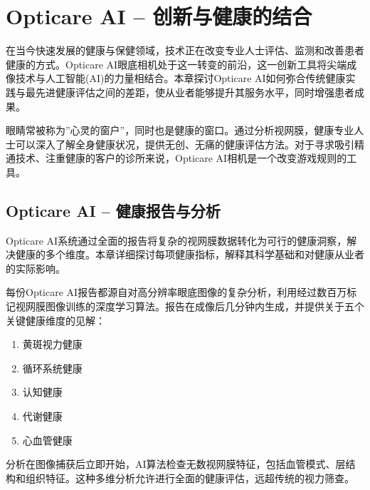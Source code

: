 \documentclass[
  Letterpaper,
]{scrbook}
\providecommand{\tightlist}{%
  \setlength{\itemsep}{0pt}\setlength{\parskip}{0pt}}\usepackage{longtable,booktabs,array}
\begin{document}

\chapter{Opticare AI --
创新与健康的结合}\label{opticare-ai-ux521bux65b0ux4e0eux5065ux5eb7ux7684ux7ed3ux5408}

在当今快速发展的健康与保健领域，技术正在改变专业人士评估、监测和改善患者健康的方式。Opticare
AI眼底相机处于这一转变的前沿，这一创新工具将尖端成像技术与人工智能(AI)的力量相结合。本章探讨Opticare
AI如何弥合传统健康实践与最先进健康评估之间的差距，使从业者能够提升其服务水平，同时增强患者成果。

眼睛常被称为''心灵的窗户''，同时也是健康的窗口。通过分析视网膜，健康专业人士可以深入了解全身健康状况，提供无创、无痛的健康评估方法。对于寻求吸引精通技术、注重健康的客户的诊所来说，Opticare
AI相机是一个改变游戏规则的工具。

\section{Opticare AI --
健康报告与分析}\label{opticare-ai-ux5065ux5eb7ux62a5ux544aux4e0eux5206ux6790}

Opticare
AI系统通过全面的报告将复杂的视网膜数据转化为可行的健康洞察，解决健康的多个维度。本章详细探讨每项健康指标，解释其科学基础和对健康从业者的实际影响。

每份Opticare
AI报告都源自对高分辨率眼底图像的复杂分析，利用经过数百万标记视网膜图像训练的深度学习算法。报告在成像后几分钟内生成，并提供关于五个关键健康维度的见解：

\begin{enumerate}
\def\labelenumi{\arabic{enumi}.}
\tightlist
\item
  黄斑视力健康
\item
  循环系统健康
\item
  认知健康
\item
  代谢健康
\item
  心血管健康
\end{enumerate}

分析在图像捕获后立即开始，AI算法检查无数视网膜特征，包括血管模式、层结构和组织特征。这种多维分析允许进行全面的健康评估，远超传统的视力筛查。
\end{document}
